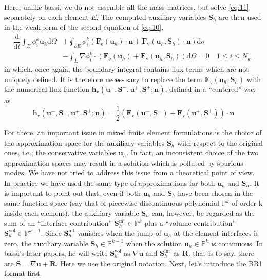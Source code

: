 \documentclass{develop-note}
\begin{document}
Here, unlike bassi, we do not assemble all the mass matrices, but solve \autoref{eq:11} separately on each element $E$. The computed auxiliary variables $\mathbf{S}_{h}$ are then used in the weak form of the second equation of \autoref{eq:10},
\begin{equation}
  \label{eq:13}
  \begin{aligned}
    \dfrac{\mathrm{d}}{\mathrm{d}t}\int_{E}\phi_{i}^{k}\mathbf{u}_{h}\mathrm{d}\Omega &+\oint_{\partial E}\phi_{i}^{k}(\mathbf{F}_{\mathrm{e}}(\mathbf{u}_{h})\cdot\mathbf{n}+\mathbf{F}_{\mathrm{v}}(\mathbf{u}_{h},\mathbf{S}_{h})\cdot\mathbf{n})\mathrm{d}\sigma\\
    &-\int_{E}\nabla\phi_{i}^{k}\cdot(\mathbf{F}_{\mathrm{e}}(\mathbf{u}_{h})+\mathbf{F}_{\mathrm{v}}(\mathbf{u}_{h},\mathbf{S}_{h}))\mathrm{d}\Omega=0\quad 1\leqslant i\leqslant N_{k},
  \end{aligned}
\end{equation}
in which, once again, the boundary integral contains flux terms which are not uniquely defined. It is therefore neces- sary to replace the term $\mathbf{F}_{\mathrm{v}}(\mathbf{u}_{h},\mathbf{S}_{h})$ with the numerical flux function $\mathbf{h}_{\mathrm{v}}(\mathbf{u}^{-},\mathbf{S}^{-},\mathbf{u}^{+},\mathbf{S}^{+};\mathbf{n})$, defined in a ``centered'' way as
\begin{equation}
  \mathbf{h}_{\mathrm{v}}(\mathbf{u}^{-},\mathbf{S}^{-},\mathbf{u}^{+},\mathbf{S}^{+};\mathbf{n})=\dfrac{1}{2}(\mathbf{F}_{\mathrm{v}}(\mathbf{u}^{-},\mathbf{S}^{-})+\mathbf{F}_{\mathrm{v}}(\mathbf{u}^{+},\mathbf{S}^{+}))\cdot\mathbf{n}
\end{equation}

For there, an important issue in mixed finite element formulations is the choice of the approximation space for the auxiliary variables $\mathbf{S}_{h}$ with respect to the original ones, i.e., the conservative variables $\mathbf{u}_{h}$. In fact, an inconsistent choice of the two approximation spaces may result in a solution which is polluted by spurious modes. We have not tried to address this issue from a theoretical point of view. In practice we have used the same type of approximations for both $\mathbf{u}_{h}$ and $\mathbf{S}_{h}$. It is important to point out that, even if both $\mathbf{u}_{h}$ and $\mathbf{S}_{h}$ have been chosen in the same function space (say that of piecewise discontinuous polynomial $\mathbb{P}^{k}$ of order k inside each element), the auxiliary variable $\mathbf{S}_{h}$ can, however, be regarded as the sum of an ``interface contribution'' $\mathbf{S}_{h}^{\mathrm{int}}\in\mathbb{P}^{k}$ plus a ``volume contribution'' $\mathbf{S}_{h}^{\mathrm{vol}}\in\mathbb{P}^{k-1}$. Since $\mathbf{S}_{h}^{\mathrm{int}}$ vanishes when the jump of $\mathbf{u}_{h}$ at the element interfaces is zero, the auxiliary variable $\mathbf{S}_{h}\in\mathbb{P}^{k-1}$ when the solution $\mathbf{u}_{h}\in\mathbb{P}^{k}$ is continuous. In bassi's later papers, he will write $\mathbf{S}_{h}^{\mathrm{vol}}$ as $\nabla\mathbf{u}$ and $\mathbf{S}_{h}^{\mathrm{int}}$ as $\mathbf{R}$, that is to say, there are $\mathbf{S}=\nabla\mathbf{u}+\mathbf{R}$. Here we use the original notation. Next, let's introduce the BR1 format first.
\end{document}
